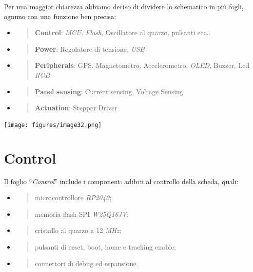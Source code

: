 \noindent Per una maggior chiarezza abbiamo deciso di dividere lo schematico in
più fogli, ognuno con una funzione ben precisa:

\begin{itemize}
\item
  \begin{quote}
  \textbf{Control}: \emph{MCU}, \emph{Flash}, Oscillatore al quarzo,
  pulsanti ecc..
  \end{quote}
\item
  \begin{quote}
  \textbf{Power}: Regolatore di tensione, \emph{USB}
  \end{quote}
\item
  \begin{quote}
  \textbf{Peripherals}: GPS, Magnetometro, Accelerometro, \emph{OLED},
  Buzzer, Led \emph{RGB}
  \end{quote}
\item
  \begin{quote}
  \textbf{Panel} \textbf{sensing}: Current sensing, Voltage Sensing
  \end{quote}
\item
  \begin{quote}
  \textbf{Actuation}: Stepper Driver
  \end{quote}
\end{itemize}

\begin{center}
\texttt{[image: figures/image32.png]}
\captionsetup{type=figure}
\end{center}

\hypertarget{control}{%
\section{Control}\label{control}}

Il foglio ``\emph{Control}'' include i componenti adibiti al controllo
della scheda, quali:

\begin{itemize}
\item
  \begin{quote}
  microcontrollore \emph{RP2040};
  \end{quote}
\item
  \begin{quote}
  memoria flash SPI \emph{W25Q16JV};
  \end{quote}
\item
  \begin{quote}
  cristallo al quarzo a 12 \emph{MHz};
  \end{quote}
\item
  \begin{quote}
  pulsanti di reset, boot, home e tracking enable;
  \end{quote}
\item
  \begin{quote}
  connettori di debug ed espansione.
  \end{quote}
\end{itemize}

